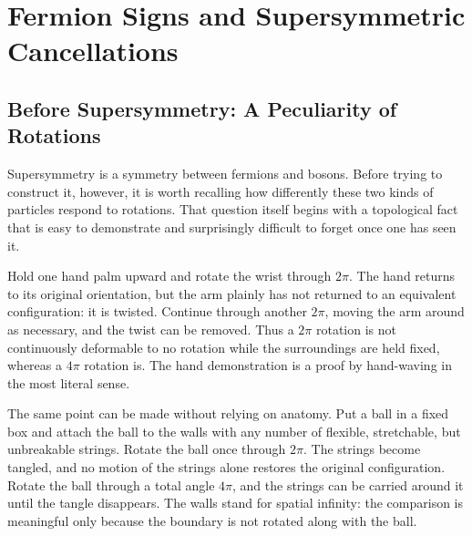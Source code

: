 \chapter{Fermion Signs and Supersymmetric Cancellations}


\section{Before Supersymmetry: A Peculiarity of Rotations}

Supersymmetry is a symmetry between fermions and bosons. Before trying to construct it, however, it is worth recalling how differently these two kinds of particles respond to rotations. That question itself begins with a topological fact that is easy to demonstrate and surprisingly difficult to forget once one has seen it.

Hold one hand palm upward and rotate the wrist through \(2\pi\). The hand returns to its original orientation, but the arm plainly has not returned to an equivalent configuration: it is twisted. Continue through another \(2\pi\), moving the arm around as necessary, and the twist can be removed. Thus a \(2\pi\) rotation is not continuously deformable to no rotation while the surroundings are held fixed, whereas a \(4\pi\) rotation is. The hand demonstration is a proof by hand-waving in the most literal sense.

The same point can be made without relying on anatomy. Put a ball in a fixed box and attach the ball to the walls with any number of flexible, stretchable, but unbreakable strings. Rotate the ball once through \(2\pi\). The strings become tangled, and no motion of the strings alone restores the original configuration. Rotate the ball through a total angle \(4\pi\), and the strings can be carried around it until the tangle disappears. The walls stand for spatial infinity: the comparison is meaningful only because the boundary is not rotated along with the ball.

